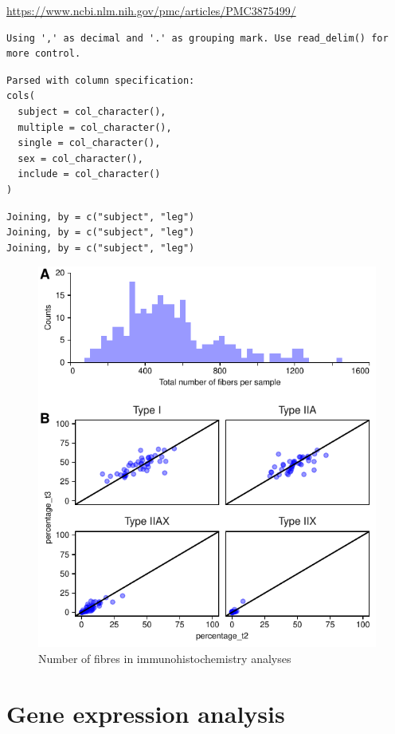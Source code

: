 \documentclass[twoside,10pt]{gihclass} %
\begin{document}
\url{https://www.ncbi.nlm.nih.gov/pmc/articles/PMC3875499/}
\begin{verbatim}
Using ',' as decimal and '.' as grouping mark. Use read_delim() for more control.
\end{verbatim}
\begin{verbatim}
Parsed with column specification:
cols(
  subject = col_character(),
  multiple = col_character(),
  single = col_character(),
  sex = col_character(),
  include = col_character()
)
\end{verbatim}
\begin{verbatim}
Joining, by = c("subject", "leg")
Joining, by = c("subject", "leg")
Joining, by = c("subject", "leg")
\end{verbatim}
\begin{figure}

{\centering \includegraphics{thesis_files/figure-latex/immuno-methods-1} 

}

\caption[Fiber counts]{Number of fibres in immunohistochemistry analyses}\label{fig:immuno-methods}
\end{figure}
\hypertarget{gene-expression-analysis}{%
\section{Gene expression analysis}\label{gene-expression-analysis}}
\end{document}
